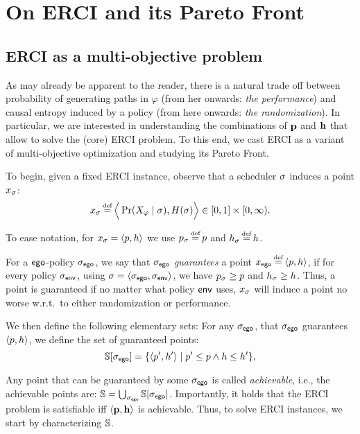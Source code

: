 \section{On ERCI and its Pareto Front}\label{sec:convex}
\subsection{ERCI as a multi-objective problem}
As may already be apparent to the reader, there is a natural trade off
between probability of generating paths in $\varphi$ (from her
onwards: \emph{the performance}) and causal entropy induced by a
policy (from here onwards: \emph{the randomization}).  In particular,
we are interested in understanding the combinations of $\mathbf{p}$
and $\mathbf{h}$ that allow to solve the (core) ERCI problem. To this
end, we cast ERCI as a variant of multi-objective optimization and
studying its Pareto Front.

To begin, given a fixed ERCI instance, observe that a scheduler $\sigma$
induces a point $x_\sigma$:
\begin{equation}
  x_\sched \eqdef \Big\langle \Pr(X_\varphi \mid \sched), H(\sched) \Big\rangle \in [0,1] \times [0,\infty).  
\end{equation}

To ease notation, for $x_\sigma = \langle p,h \rangle$ we use
$\scp_\sched \eqdef \scp$ and $\rndp_\sched \eqdef \rndp$.

For a $\mathsf{ego}$-policy ${\sigma_{\mathsf{ego}}}$, we say that ${\sigma_{\mathsf{ego}}}$
\emph{guarantees} a point $x_\pOne \eqdef \langle \scp, \rndp
\rangle$, if for every policy ${\sigma_{\mathsf{env}}}$, using $\sigma = \langle
{\sigma_{\mathsf{ego}}}, {\sigma_{\mathsf{env}}} \rangle$, we have $p_\sigma \geq p$ and
$h_\sigma \geq h$. Thus, a point is guaranteed if no matter
what policy $\mathsf{env}$ uses, $x_\sigma$ will induce a point no worse
w.r.t.\ to either randomization or performance.

We then define the following elementary sets: For any ${\sigma_{\mathsf{ego}}}$,
that ${\sigma_{\mathsf{ego}}}$ guarantees $\langle p, h \rangle$, we define
the set of guaranteed points:
\begin{equation}\label{eq:guaranteed}
\solutions[\pOneSched] = \{ \langle \scp', \rndp' \rangle \mid \scp' \leq \scp \wedge \rndp \leq \rndp'\},
\end{equation}

Any point that can be guaranteed by some ${\sigma_{\mathsf{ego}}}$ is called
\emph{achievable}, i.e., the achievable points are: $ \mathbb{S} =
\bigcup_{{\sigma_{\mathsf{ego}}}} \mathbb{S}[{\sigma_{\mathsf{ego}}}]$.  Importantly, it holds
that the ERCI problem is satisfiable iff $\langle \mathbf{p},
\mathbf{h} \rangle$ is achievable.   Thus, to solve ERCI instances, we start by characterizing
$\mathbb{S}$.


